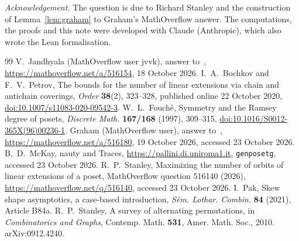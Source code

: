 \documentclass[11pt]{amsart}
\theoremstyle{remark}
\begin{document}
\emph{Acknowledgement.} The question is due to Richard Stanley and the construction of Lemma~\ref{lem:graham} to Graham's MathOverflow answer. The computations, the proofs and this note were developed with Claude (Anthropic), which also wrote the Lean formalisation.

\begin{thebibliography}{99}
 V.~Jandhyala (MathOverflow user jvvk), answer to~\cite{MO}, \url{https://mathoverflow.net/a/516154}, 18 October 2026.
 I.~A.~Bochkov and F.~V.~Petrov, The bounds for the number of linear extensions via chain and antichain coverings, \emph{Order} \textbf{38}(2), 323--328, published online 22 October 2020, \href{https://doi.org/10.1007/s11083-020-09542-3}{doi:10.1007/s11083-020-09542-3}.
 W.~L.~Fouch\'e, Symmetry and the Ramsey degree of posets, \emph{Discrete Math.} \textbf{167/168} (1997), 309--315, \href{https://doi.org/10.1016/S0012-365X(96)00236-1}{doi:10.1016/S0012-365X(96)00236-1}.
 Graham (MathOverflow user), answer to~\cite{MO}, \url{https://mathoverflow.net/a/516180}, 19 October 2026, accessed 23 October 2026.
 B.~D.~McKay, nauty and Traces, \url{https://pallini.di.uniroma1.it}, \texttt{genposetg}, accessed 23 October 2026.
 R.~P.~Stanley, Maximizing the number of orbits of linear extensions of a poset, MathOverflow question 516140 (2026), \url{https://mathoverflow.net/q/516140}, accessed 23 October 2026.
 I.~Pak, Skew shape asymptotics, a case-based introduction, \emph{S\'em. Lothar. Combin.} \textbf{84} (2021), Article B84a.
 R.~P.~Stanley, A survey of alternating permutations, in \emph{Combinatorics and Graphs}, Contemp. Math. \textbf{531}, Amer. Math. Soc., 2010. arXiv:0912.4240.
\end{thebibliography}
\end{document}

